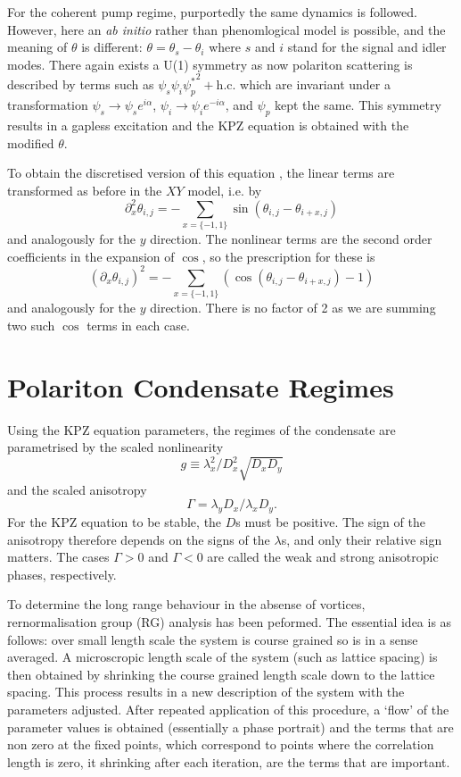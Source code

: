 For the coherent pump regime, purportedly the same dynamics is followed. However, here an \emph{ab initio} rather than phenomlogical model is possible, and the meaning of $\theta$ is different: $\theta = \theta_s - \theta_i$ where $s$ and $i$ stand for the signal and idler modes. There again exists a U(1) symmetry as now polariton scattering is described by terms such as $\psi_s\psi_i{\psi_p^*}^2 + \text{h.c.}$ which are invariant under a transformation $\psi_s \to \psi_se^{i\alpha}$, $\psi_i \to \psi_ie^{-i\alpha}$, and $\psi_p$ kept the same. This symmetry
results in a gapless excitation and the KPZ equation is obtained with the modified $\theta$.

To obtain the discretised version of this equation \cite{PhysRevB.94.10452}, the linear terms are transformed as before in the $XY$ model, i.e. by 
\[
\partial_x^2 \theta_{i,j}  = -\sum_{x=\{-1,1\}} \sin(\theta_{i,j} - \theta_{i+x,j})
\]
and analogously for the $y$ direction. The nonlinear terms are the second order coefficients in the expansion of $\cos$, so the prescription for these is
\[
(\partial_x \theta_{i,j})^2  = -\sum_{x=\{-1,1\}} (\cos(\theta_{i,j} - \theta_{i+x,j})- 1)
\]
and analogously for the $y$ direction. There is no factor of 2 as we are summing two such $\cos$ terms in each case. 

\section{Polariton Condensate Regimes}

Using the KPZ equation parameters, the regimes of the condensate are parametrised \cite{PhysRevX.7.041006} by the scaled nonlinearity \[
g \equiv \lambda_x^2/D_x^2\sqrt{D_xD_y}
\]
and the scaled anisotropy
\[
\Gamma = \lambda_y D_x/\lambda_x D_y.
\]
For the KPZ equation to be stable, the $D$s must be positive. The sign of the anisotropy therefore depends on the signs of the $\lambda$s, and only their relative sign matters. The cases $\Gamma > 0$ and $\Gamma <0$ are called the weak and strong anisotropic phases, respectively. 

To determine the long range behaviour in the absense of vortices, rernormalisation group (RG) analysis has been peformed. The essential idea is as follows: over small length scale the system is course grained so is in a sense averaged. A microscropic length scale of the system (such as lattice spacing) is then obtained by shrinking the course grained length scale down to the lattice spacing. This process results in a new description of the system with the parameters adjusted. After repeated application of this procedure, a `flow' of the parameter values is obtained (essentially a phase portrait) and the terms that are non zero at the fixed points, which correspond to points where the correlation length is zero, it shrinking after each iteration, are the terms that are important. 

